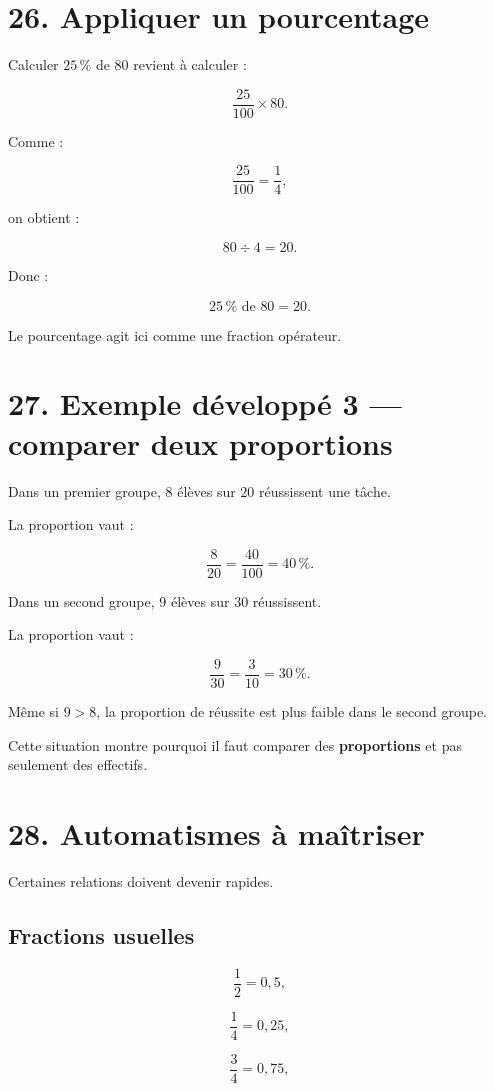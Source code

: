 \section{26. Appliquer un pourcentage}

Calculer $25\,\%$ de $80$ revient à calculer :

\[
\dfrac{25}{100}\times80.
\]

Comme :

\[
\dfrac{25}{100}
=
\dfrac{1}{4},
\]

on obtient :

\[
80\div4=20.
\]

Donc :

\[
\boxed{
25\,\%\text{ de }80=20
}.
\]

Le pourcentage agit ici comme une fraction opérateur.

\section{27. Exemple développé 3 — comparer deux proportions}

Dans un premier groupe, $8$ élèves sur $20$ réussissent une tâche.

La proportion vaut :

\[
\dfrac{8}{20}
=
\dfrac{40}{100}
=
40\,\%.
\]

Dans un second groupe, $9$ élèves sur $30$ réussissent.

La proportion vaut :

\[
\dfrac{9}{30}
=
\dfrac{3}{10}
=
30\,\%.
\]

Même si $9>8$, la proportion de réussite est plus faible dans le second groupe.

Cette situation montre pourquoi il faut comparer des \textbf{proportions} et pas seulement des effectifs.

\section{28. Automatismes à maîtriser}

Certaines relations doivent devenir rapides.

\subsection{Fractions usuelles}

\[
\dfrac{1}{2}=0{,}5,
\]

\[
\dfrac{1}{4}=0{,}25,
\]

\[
\dfrac{3}{4}=0{,}75,
\]

